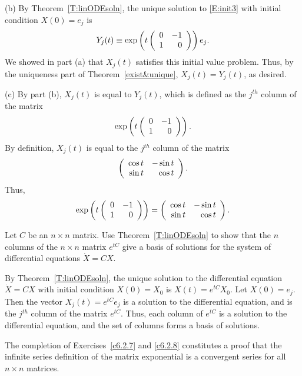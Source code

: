 \documentclass{ximera}
\begin{document}
\begin{exercise}
\begin{solution}
(b) By Theorem~\ref{T:linODEsoln}, the unique
solution to \eqref{E:init3} with initial condition $X(0) = e_j$ is
\[
Y_j(t) \equiv \exp\left(t\left(\begin{array}{rr} 0 & -1\\ 1 &0\end{array}\right)\right)e_j.
\]
We showed in part (a) that $X_j(t)$ satisfies this initial value
problem.  Thus, by the uniqueness part of Theorem~\ref{exist&unique},
$X_j(t) = Y_j(t)$, as desired.

(c) By part (b), $X_j(t)$ is equal to $Y_j(t)$, which is defined as
the $j^{th}$ column of the matrix
\[
\exp\left(t\left(\begin{array}{rr} 0 & -1\\ 1 &0\end{array}\right)\right).
\]
By definition, $X_j(t)$ is equal to the $j^{th}$ column of the matrix
\[
\left(\begin{array}{rr} \cos t & -\sin t\\ \sin t &\cos t\end{array}\right).
\]
Thus,
\[
\exp\left(t\left(\begin{array}{rr} 0 & -1\\ 1 &0\end{array}\right)\right) =
\left(\begin{array}{rr} \cos t & -\sin t\\ \sin t &\cos t\end{array}\right).
\]

\end{solution}
\end{exercise}

\begin{exercise}  \label{c6.2.6A}
Let $C$ be an $n\times n$ matrix.  Use Theorem~\ref{T:linODEsoln} to show
that the $n$ columns of the $n\times n$ matrix $e^{tC}$ give a basis of
solutions for the system of differential equations $\dot{X}=CX$.

\begin{solution}
By Theorem~\ref{T:linODEsoln},
the unique solution to the differential equation $\dot{X} = CX$ with
initial condition $X(0) = X_0$ is $X(t) = e^{tC}X_0$.  Let $X(0) =
e_j$.  Then the vector $X_j(t) = e^{tC}e_j$ is a solution to the
differential equation, and is the $j^{th}$ column of the matrix
$e^{tC}$.  Thus, each column of $e^{tC}$ is a solution to the
differential equation, and the set of columns forms a basis of
solutions.


\end{solution}
\end{exercise}

  The completion of Exercises~\ref{c6.2.7} and
\ref{c6.2.8} constitutes a proof that the infinite series definition of
the matrix exponential is a convergent series for all $n\times n$ matrices.
\end{document}
